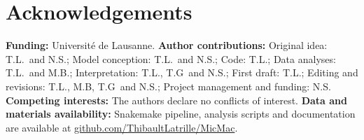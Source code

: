 \documentclass{article}
\begin{document}
\section*{Acknowledgements}
\label{sec:acknowledgment}
\textbf{Funding:}
Université de Lausanne.
\textbf{Author contributions:}
Original idea: T.L.\ and N.S.;
Model conception: T.L.\ and N.S.;
Code: T.L.;
Data analyses: T.L.\ and M.B.;
Interpretation: T.L., T.G\ and N.S.;
First draft: T.L.;
Editing and revisions: T.L., M.B, T.G\ and N.S.;
Project management and funding: N.S\@.
\textbf{Competing interests:}
The authors declare no conflicts of interest.
\textbf{Data and materials availability:}
Snakemake pipeline, analysis scripts and documentation are available at \href{https://github.com/ThibaultLatrille/MicMac}{github.com/ThibaultLatrille/MicMac}.

\printbibliography
\end{document}
